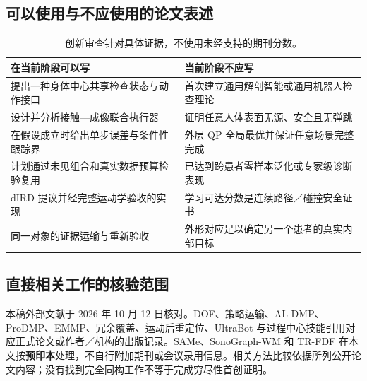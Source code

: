 \documentclass[UTF8,11pt,a4paper,fontset=fandol]{ctexart}
\numberwithin{equation}{section}
\theoremstyle{definition}
\begin{document}
\subsection{可以使用与不应使用的论文表述}
\begin{table}[H]\centering\small
\begin{tabularx}{\linewidth}{YY}
\toprule
在当前阶段可以写 & 当前阶段不应写\\\midrule
提出一种身体中心共享检查状态与动作接口 & 首次建立通用解剖智能或通用机器人检查理论\\
设计并分析接触—成像联合执行器 & 证明任意人体表面无源、安全且无弹跳\\
在假设成立时给出单步误差与条件性跟踪界 & 外层 QP 全局最优并保证任意场景完整完成\\
计划通过未见组合和真实数据预算检验复用 & 已达到跨患者零样本泛化或专家级诊断表现\\
dIRD 提议并经完整运动学验收的实现 & 学习可达分数是连续路径／碰撞安全证书\\
同一对象的证据运输与重新验收 & 外形对应足以确定另一个患者的真实内部目标\\\bottomrule
\end{tabularx}
\caption{创新审查针对具体证据，不使用未经支持的期刊分数。}
\end{table}

\subsection{直接相关工作的核验范围}
本稿外部文献于 2026 年 10 月 12 日核对。DOF、策略运输、AL-DMP、ProDMP、EMMP、冗余覆盖、运动后重定位、UltraBot 与过程中心技能引用对应正式论文或作者／机构的出版记录。SAMe、SonoGraph-WM 和 TR-FDF 在本文按\textbf{预印本}处理，不自行附加期刊或会议录用信息。相关方法比较依据所列公开论文内容；没有找到完全同构工作不等于完成穷尽性首创证明。
\end{document}
